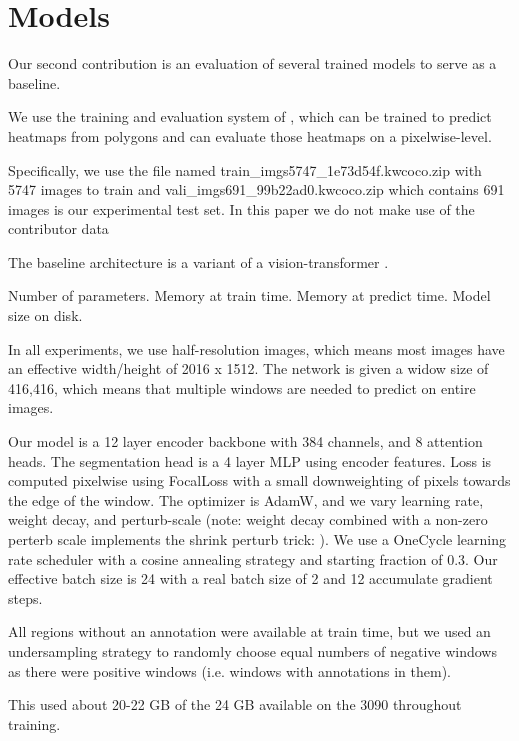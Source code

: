 \documentclass[10pt,twocolumn,letterpaper]{article}
\begin{document}
\section{Models}

Our second contribution is an evaluation of several trained models to serve as
a baseline.

We use the training and evaluation system of \cite{Greenwell_2024_WACV}, which
can be trained to predict heatmaps from polygons and can evaluate those
heatmaps on a pixelwise-level. 


Specifically, we use the file named train\_imgs5747\_1e73d54f.kwcoco.zip with
5747 images to train and vali\_imgs691\_99b22ad0.kwcoco.zip which contains 691
images is our experimental test set.
In this paper we do not make use of the contributor data


The baseline architecture is a variant \cite{bertasius2021space,Greenwell_2024_WACV} of a vision-transformer \cite{dosovitskiy_image_2021}.

Number of parameters.
Memory at train time.
Memory at predict time.
Model size on disk.

In all experiments, we use half-resolution images, which means most images have
an effective width/height of 2016 x 1512. The network is given a widow size of
416,416, which means that multiple windows are needed to predict on entire
images.

Our model is a 12 layer encoder backbone with 384 channels, and 8 attention
heads. 
The segmentation head is a 4 layer MLP using encoder features.
Loss is computed pixelwise using FocalLoss \cite{ross2017focal} with a small
downweighting of pixels towards the edge of the window.
The optimizer is AdamW, and we vary learning rate, weight decay, and
perturb-scale (note: weight decay combined with a non-zero perterb scale
implements the shrink perturb trick: \cite{ash_warm_starting_2020}).
We use a OneCycle learning rate scheduler with a cosine annealing strategy and
starting fraction of 0.3.
Our effective batch size is 24 with a real batch size of 2 and 12 accumulate
gradient steps.


All regions without an annotation were available at train time, but we used an
undersampling strategy to randomly choose equal numbers of negative windows as
there were positive windows (i.e. windows with annotations in them).

This used about 20-22 GB of the 24 GB available on the 3090 throughout
training.

\end{document}
